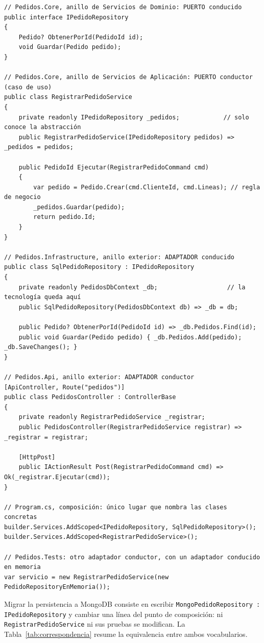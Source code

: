 \documentclass[11pt,a4paper]{article}
\begin{document}
\begin{lstlisting}[language={[Sharp]C}, caption={Puertos declarados en los anillos internos de la Cebolla y adaptadores en el anillo exterior.}, label={lst:cebolla}]
// Pedidos.Core, anillo de Servicios de Dominio: PUERTO conducido
public interface IPedidoRepository
{
    Pedido? ObtenerPorId(PedidoId id);
    void Guardar(Pedido pedido);
}

// Pedidos.Core, anillo de Servicios de Aplicación: PUERTO conductor (caso de uso)
public class RegistrarPedidoService
{
    private readonly IPedidoRepository _pedidos;            // solo conoce la abstracción
    public RegistrarPedidoService(IPedidoRepository pedidos) => _pedidos = pedidos;

    public PedidoId Ejecutar(RegistrarPedidoCommand cmd)
    {
        var pedido = Pedido.Crear(cmd.ClienteId, cmd.Lineas); // regla de negocio
        _pedidos.Guardar(pedido);
        return pedido.Id;
    }
}

// Pedidos.Infrastructure, anillo exterior: ADAPTADOR conducido
public class SqlPedidoRepository : IPedidoRepository
{
    private readonly PedidosDbContext _db;                   // la tecnología queda aquí
    public SqlPedidoRepository(PedidosDbContext db) => _db = db;

    public Pedido? ObtenerPorId(PedidoId id) => _db.Pedidos.Find(id);
    public void Guardar(Pedido pedido) { _db.Pedidos.Add(pedido); _db.SaveChanges(); }
}

// Pedidos.Api, anillo exterior: ADAPTADOR conductor
[ApiController, Route("pedidos")]
public class PedidosController : ControllerBase
{
    private readonly RegistrarPedidoService _registrar;
    public PedidosController(RegistrarPedidoService registrar) => _registrar = registrar;

    [HttpPost]
    public IActionResult Post(RegistrarPedidoCommand cmd) => Ok(_registrar.Ejecutar(cmd));
}

// Program.cs, composición: único lugar que nombra las clases concretas
builder.Services.AddScoped<IPedidoRepository, SqlPedidoRepository>();
builder.Services.AddScoped<RegistrarPedidoService>();

// Pedidos.Tests: otro adaptador conductor, con un adaptador conducido en memoria
var servicio = new RegistrarPedidoService(new PedidoRepositoryEnMemoria());
\end{lstlisting}

Migrar la persistencia a MongoDB consiste en escribir
\texttt{MongoPedidoRepository : IPedidoRepository} y cambiar una línea del punto de
composición: ni \texttt{RegistrarPedidoService} ni sus pruebas se modifican. La
Tabla~\ref{tab:correspondencia} resume la equivalencia entre ambos vocabularios.
\end{document}
